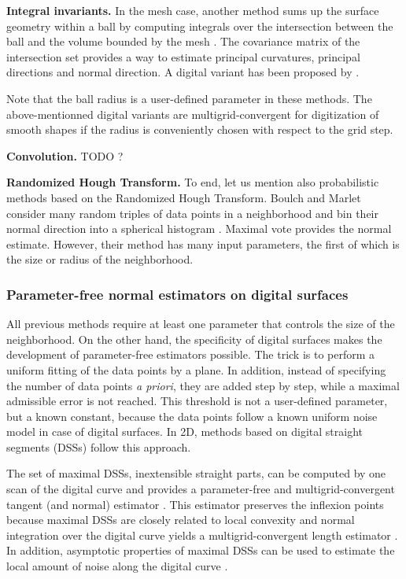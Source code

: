 \noindent\textbf{Integral invariants.}
In the mesh case, another method sums up the surface geometry within a ball by 
computing integrals over the intersection between the ball and the volume
bounded by the mesh \cite{Pottmann2009}. The covariance matrix of the intersection set 
provides a way to estimate principal curvatures, principal directions and normal direction.
A digital variant has been proposed by \citeauthor*{Lachaud2017} \cite{Lachaud2017}.

Note that the ball radius is a user-defined parameter in these methods. The above-mentionned
digital variants \cite{Cuel2015,Lachaud2017} are multigrid-convergent for digitization
of smooth shapes if the radius is conveniently chosen with respect to the grid step.

\noindent\textbf{Convolution.}
TODO ?

\noindent\textbf{Randomized Hough Transform.}
To end, let us mention also probabilistic methods based on the Randomized Hough Transform.
Boulch and Marlet consider many random triples of data points in a neighborhood
and bin their normal direction into a spherical histogram \cite{Boulch2012}.
Maximal vote provides the normal estimate. However, their method has many input parameters,
the first of which is the size or radius of the neighborhood. 

\subsubsection{Parameter-free normal estimators on digital surfaces}
\label{sec:estim:ds}

All previous methods require at least one parameter that controls the size of the neighborhood.
On the other hand, the specificity of digital surfaces makes the development of parameter-free
estimators possible. The trick is to perform a uniform fitting of the data points by a plane.
In addition, instead of specifying the number of data points \emph{a priori}, they are added
step by step, while a maximal admissible error is not reached. This threshold is not a user-defined
parameter, but a known constant, because the data points follow a known uniform noise model
in case of digital surfaces. In 2D, methods based on digital straight segments (DSSs) follow
this approach.

The set of maximal DSSs, \ie inextensible straight parts, can be computed by one scan of the
digital curve \cite{Feschet1999,Feschet2005} and provides a parameter-free and multigrid-convergent
tangent (and normal) estimator \cite{Lachaud2007}.
This estimator preserves the inflexion points because maximal DSSs are closely related to
local convexity \cite{Roussillon2011} and normal integration over the digital curve yields
a multigrid-convergent length estimator \cite{Coeurjolly2004}. 
In addition, asymptotic properties of maximal DSSs can be used to estimate the local amount
of noise along the digital curve \cite{Kerautret2012}.  

